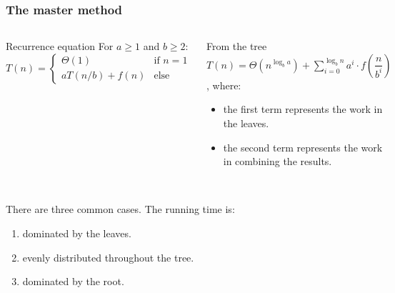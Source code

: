 \begin{frame}
	\frametitle{The master method}
	\begin{columns}[t]
	\begin{block}{Recurrence equation}
		For $a\geq 1$	and $b \geq 2$:\\
		$T(n) = \begin{cases}
			\Theta(1) & \text{if } n=1\\
			aT(n/b) + f(n) & \text{else}
		\end{cases}$
	\end{block}		
			

	\begin{answerblock}{From the tree}
		$T(n) = \Theta(n^{\log_b a}) + \sum\limits_{i=0}^{\log_b n} a^i\cdot f(\dfrac{n}{b^i})$, where:
		\begin{itemize}
			\item the first term represents the work in the leaves.
			\item the second term represents the work in combining the results.
		\end{itemize}
	\end{answerblock}
			
	\end{columns}

	\pause
	\hfill\\
	There are three common cases. The running time is: 
	\begin{enumerate}
		\item	dominated by \alert{the leaves}.
		\item	\alert{evenly distributed} throughout the tree.
		\item	dominated by \alert{the root}.
	\end{enumerate}

\end{frame}

